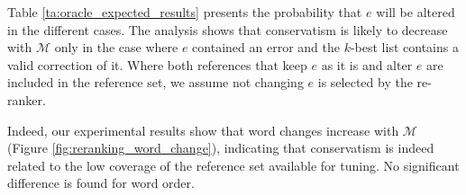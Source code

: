 \documentclass[letterpaper, 11pt]{article}
\begin{document}
Table \ref{ta:oracle_expected_results} presents the probability that $e$ will be altered in the different cases.
The analysis shows that conservatism is likely to decrease with $\mathcal{M}$ only
  in the case where $e$ contained an error and the $k$-best list contains a valid correction of it.
Where both references that keep $e$ as it is and alter $e$ are included in the reference
set, we assume not changing $e$ is selected by the re-ranker. 

Indeed, our experimental results show that word changes increase with $\mathcal{M}$ (Figure \ref{fig:reranking_word_change}),
indicating that conservatism is indeed related to the low coverage of the reference set available for tuning.
No significant difference is found for word order.
\end{document}

